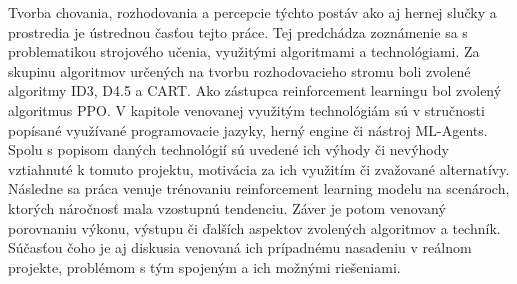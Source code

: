 \documentclass[slovak, master]{diploma}
\begin{document}
Tvorba chovania, rozhodovania a percepcie týchto postáv ako aj hernej slučky a prostredia je ústrednou časťou tejto práce. Tej predchádza zoznámenie sa s problematikou strojového učenia, využitými algoritmami a technológiami. Za skupinu algoritmov určených na tvorbu rozhodovacieho stromu boli zvolené algoritmy ID3, D4.5 a CART. Ako zástupca reinforcement learningu bol zvolený algoritmus PPO. V kapitole venovanej využitým technológiám sú v stručnosti popísané využívané programovacie jazyky, herný engine či nástroj ML-Agents. Spolu s popisom daných technológií sú uvedené ich výhody či nevýhody vztiahnuté k tomuto projektu, motivácia za ich využitím či zvažované alternatívy. Následne sa práca venuje trénovaniu reinforcement learning modelu na scenároch, ktorých náročnosť mala vzostupnú tendenciu. Záver je potom venovaný porovnaniu výkonu, výstupu či ďalších aspektov zvolených algoritmov a techník. Súčasťou čoho je aj diskusia venovaná ich prípadnému nasadeniu v reálnom projekte, problémom s tým spojeným a ich možnými riešeniami.
\end{document}
